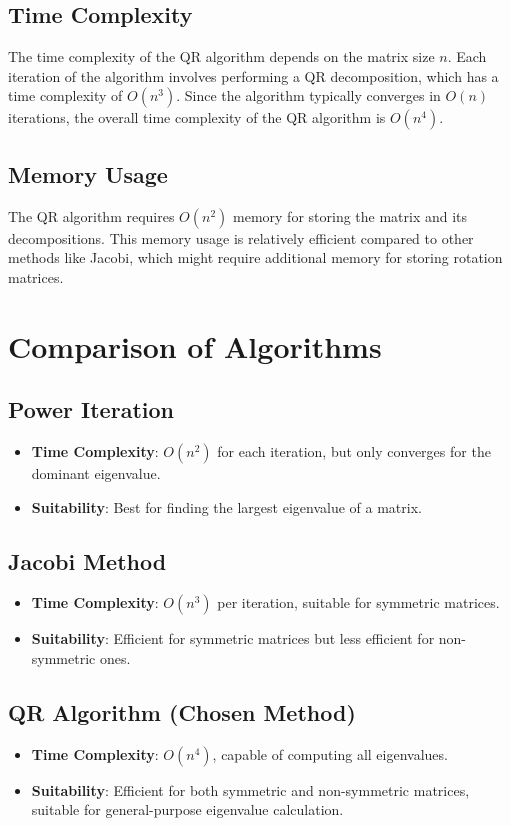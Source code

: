 \documentclass[12pt]{article}
\begin{document}
\subsection{Time Complexity}
The time complexity of the QR algorithm depends on the matrix size \( n \). Each iteration of the algorithm involves performing a QR decomposition, which has a time complexity of \( O(n^3) \). Since the algorithm typically converges in \( O(n) \) iterations, the overall time complexity of the QR algorithm is \( O(n^4) \).

\subsection{Memory Usage}
The QR algorithm requires \( O(n^2) \) memory for storing the matrix and its decompositions. This memory usage is relatively efficient compared to other methods like Jacobi, which might require additional memory for storing rotation matrices.

\section{Comparison of Algorithms}

\subsection{Power Iteration}
\begin{itemize}
    \item \textbf{Time Complexity}: \( O(n^2) \) for each iteration, but only converges for the dominant eigenvalue.
    \item \textbf{Suitability}: Best for finding the largest eigenvalue of a matrix.
\end{itemize}

\subsection{Jacobi Method}
\begin{itemize}
    \item \textbf{Time Complexity}: \( O(n^3) \) per iteration, suitable for symmetric matrices.
    \item \textbf{Suitability}: Efficient for symmetric matrices but less efficient for non-symmetric ones.
\end{itemize}

\subsection{QR Algorithm (Chosen Method)}
\begin{itemize}
    \item \textbf{Time Complexity}: \( O(n^4) \), capable of computing all eigenvalues.
    \item \textbf{Suitability}: Efficient for both symmetric and non-symmetric matrices, suitable for general-purpose eigenvalue calculation.
\end{itemize}
\end{document}
